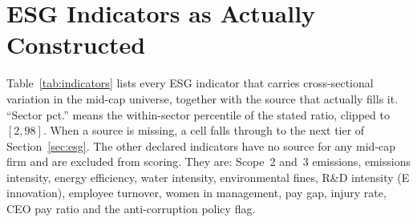 
\section{ESG Indicators as Actually Constructed}
\label{app:indicators}

Table~\ref{tab:indicators} lists every ESG indicator that carries
cross-sectional variation in the mid-cap universe, together with the source
that actually fills it. ``Sector pct.'' means the within-sector percentile of
the stated ratio, clipped to $[2,98]$. When a source is missing, a cell falls
through to the next tier of Section~\ref{sec:esg}. The other
\NIndUnused declared indicators have no source for any mid-cap
firm and are excluded from scoring. They are: Scope~2 and~3 emissions,
emissions intensity, energy efficiency, water intensity, environmental fines,
R\&D intensity (E innovation), employee turnover, women in management, pay
gap, injury rate, CEO pay ratio and the anti-corruption policy flag.

